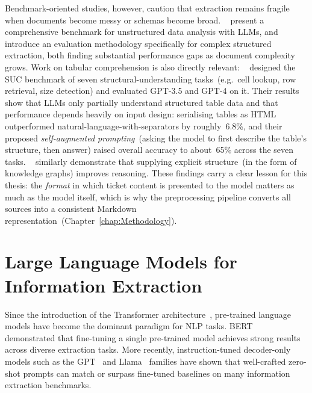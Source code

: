 Benchmark-oriented studies, however, caution that extraction remains fragile
when documents become messy or schemas become broad.
\citeauthor{deng2025unstructured}~\cite{deng2025unstructured} present a
comprehensive benchmark for unstructured data analysis with LLMs, and
\citeauthor{ferguson2026extractbench}~\cite{ferguson2026extractbench} introduce
an evaluation methodology specifically for complex structured extraction, both
finding substantial performance gaps as document complexity grows.  Work on
tabular comprehension is also directly relevant:
\citeauthor{sui2024table}~\cite{sui2024table} designed the \textsc{SUC}
benchmark of seven structural-understanding tasks~(e.g.\ cell lookup, row
retrieval, size detection) and evaluated GPT-3.5 and GPT-4 on it.  Their
results show that LLMs only partially understand structured table data and that
performance depends heavily on input design: serialising tables as HTML
outperformed natural-language-with-separators by roughly~6.8\%, and their
proposed \emph{self-augmented prompting}~(asking the model to first describe the
table's structure, then answer) raised overall accuracy to about~65\% across
the seven tasks.  \citeauthor{he2024thinking}~\cite{he2024thinking} similarly
demonstrate that supplying explicit structure~(in the form of knowledge graphs)
improves reasoning.  These findings carry a clear lesson for this thesis: the
\emph{format} in which ticket content is presented to the model matters as much
as the model itself, which is why the preprocessing pipeline converts all
sources into a consistent Markdown representation~(Chapter~\ref{chap:Methodology}).

\section{Large Language Models for Information Extraction}
\label{sec:rw-llm-ie}
%
Since the introduction of the Transformer architecture~\cite{vaswani2017attention},
pre-trained language models have become the dominant paradigm for NLP tasks.
\textsc{BERT}~\cite{devlin2019bert} demonstrated that fine-tuning a single
pre-trained model achieves strong results across diverse extraction tasks.
More recently, instruction-tuned decoder-only models such as the
GPT~\cite{brown2020language} and Llama~\cite{touvron2023llama} families have shown
that well-crafted zero-shot prompts can match or surpass fine-tuned baselines on
many information extraction benchmarks.


